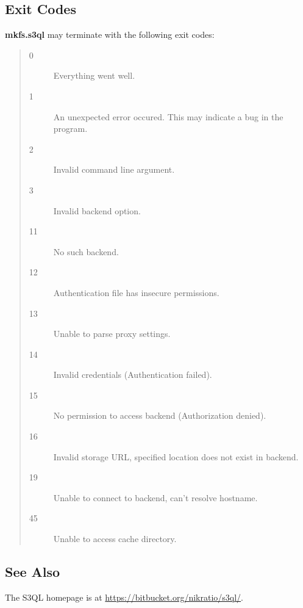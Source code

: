 \documentclass[letterpaper,10pt,english]{sphinxmanual}
\begin{document}
\subsection{Exit Codes}
\label{man/mkfs:exit-codes}
\textbf{mkfs.s3ql} may terminate with the following exit codes:
\begin{quote}\begin{description}
\item[{0}] \leavevmode
Everything went well.

\item[{1}] \leavevmode
An unexpected error occured. This may indicate a bug in the
program.

\item[{2}] \leavevmode
Invalid command line argument.

\item[{3}] \leavevmode
Invalid backend option.

\item[{11}] \leavevmode
No such backend.

\item[{12}] \leavevmode
Authentication file has insecure permissions.

\item[{13}] \leavevmode
Unable to parse proxy settings.

\item[{14}] \leavevmode
Invalid credentials (Authentication failed).

\item[{15}] \leavevmode
No permission to access backend (Authorization denied).

\item[{16}] \leavevmode
Invalid storage URL, specified location does not exist in backend.

\item[{19}] \leavevmode
Unable to connect to backend, can't resolve hostname.

\item[{45}] \leavevmode
Unable to access cache directory.

\end{description}\end{quote}


\subsection{See Also}
\label{man/mkfs:see-also}
The S3QL homepage is at \href{https://bitbucket.org/nikratio/s3ql/}{https://bitbucket.org/nikratio/s3ql/}.
\end{document}
